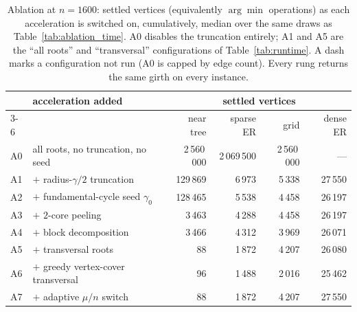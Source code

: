 
\begin{table}[ht]
\centering
\footnotesize
\setlength{\tabcolsep}{4pt}
\begin{tabular}{|l|l|r|r|r|r|}
\hline
 & \textbf{acceleration added} & \multicolumn{4}{c|}{\textbf{settled vertices}} \\ \cline{3-6}
 & & near tree & sparse ER & grid & dense ER \\ \hline
A0 & all roots, no truncation, no seed & 2\,560\,000 & 2\,069\,500 & 2\,560\,000 & --- \\ \hline
A1 & $+$ radius-$\gamma/2$ truncation & 129\,869 & 6\,973 & 5\,338 & 27\,550 \\ \hline
A2 & $+$ fundamental-cycle seed $\gamma_0$ & 128\,465 & 5\,538 & 4\,458 & 26\,197 \\ \hline
A3 & $+$ $2$-core peeling & 3\,463 & 4\,288 & 4\,458 & 26\,197 \\ \hline
A4 & $+$ block decomposition & 3\,466 & 4\,312 & 3\,969 & 26\,071 \\ \hline
A5 & $+$ transversal roots & 88 & 1\,872 & 4\,207 & 26\,080 \\ \hline
A6 & $+$ greedy vertex-cover transversal & 96 & 1\,488 & 2\,016 & 25\,462 \\ \hline
A7 & $+$ adaptive $\mu/n$ switch & 88 & 1\,872 & 4\,207 & 27\,550 \\ \hline
\end{tabular}
\caption{Ablation at $n=1600$: settled vertices (equivalently $\arg\min$
operations) as each acceleration is switched on, cumulatively, median over the
same draws as Table~\ref{tab:ablation_time}. A0 disables the
truncation entirely; A1 and A5 are the ``all roots'' and ``transversal''
configurations of Table~\ref{tab:runtime}. A dash marks a configuration not
run (A0 is capped by edge count). Every rung returns the same girth on every
instance.}
\label{tab:ablation}
\end{table}
